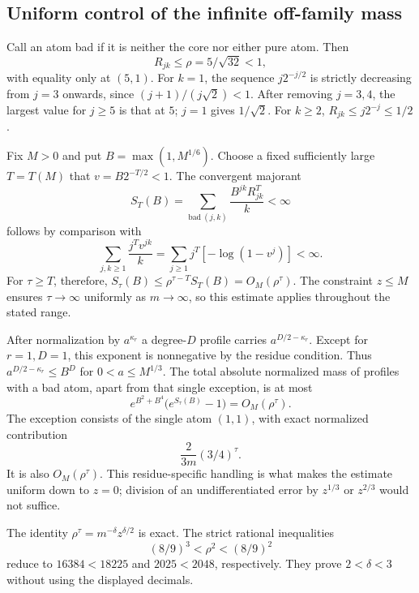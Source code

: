 \documentclass[11pt,letterpaper]{article}
\numberwithin{equation}{section}
\theoremstyle{definition}\newtheorem{definition}[theorem]{Definition}
\theoremstyle{remark}\newtheorem{remark}[theorem]{Remark}
\begin{document}
\subsection{Uniform control of the infinite off-family mass}
Call an atom bad if it is neither the core nor either pure atom. Then
\begin{equation}\label{det:dia:eq:badrho}
 R_{jk}\leq\rho=5/\sqrt{32}<1,
\end{equation}
with equality only at $(5,1)$. For $k=1$, the sequence $j2^{-j/2}$
is strictly decreasing from $j=3$ onwards, since
$(j+1)/(j\sqrt2)<1$. After removing $j=3,4$, the largest value for
$j\geq5$ is that at $5$; $j=1$ gives $1/\sqrt2$. For $k\geq2$,
$R_{jk}\leq j2^{-j}\leq1/2$.

Fix $M>0$ and put $B=\max(1,M^{1/6})$. Choose a fixed sufficiently
large $T=T(M)$ that $v=B2^{-T/2}<1$. The convergent majorant
\begin{equation}\label{det:dia:eq:ST}
 S_T(B)=\sum_{\mathrm{bad}\ (j,k)}\frac{B^{jk}R_{jk}^T}{k}<\infty
\end{equation}
follows by comparison with
\[
 \sum_{j,k\geq1}\frac{j^T v^{jk}}k
 =\sum_{j\geq1}j^T[-\log(1-v^j)]<\infty.
\]
For $\tau\geq T$, therefore,
$S_\tau(B)\leq\rho^{\tau-T}S_T(B)=O_M(\rho^\tau)$.
The constraint $z\leq M$ ensures $\tau\to\infty$ uniformly as
$m\to\infty$, so this estimate applies throughout the stated range.

After normalization by $a^{\kappa_r}$ a degree-$D$ profile carries
$a^{D/2-\kappa_r}$. Except for $r=1,D=1$, this exponent is nonnegative
by the residue condition. Thus $a^{D/2-\kappa_r}\leq B^D$ for
$0<a\leq M^{1/3}$. The total absolute normalized mass of profiles
with a bad atom, apart from that single exception, is at most
\begin{equation}\label{det:dia:eq:badmass}
 e^{B^2+B^4}\bigl(e^{S_\tau(B)}-1\bigr)=O_M(\rho^\tau).
\end{equation}
The exception consists of the single atom $(1,1)$, with exact normalized
contribution
\begin{equation}\label{det:dia:eq:exception}
 \frac{2}{3m}(3/4)^\tau.
\end{equation}
It is also $O_M(\rho^\tau)$. This residue-specific handling is what
makes the estimate uniform down to $z=0$; division of an undifferentiated
error by $z^{1/3}$ or $z^{2/3}$ would not suffice.

The identity $\rho^\tau=m^{-\delta}z^{\delta/2}$ is exact. The strict
rational inequalities
\[
 (8/9)^3<\rho^2<(8/9)^2
\]
reduce to $16384<18225$ and $2025<2048$, respectively. They prove
$2<\delta<3$ without using the displayed decimals.
\end{document}
